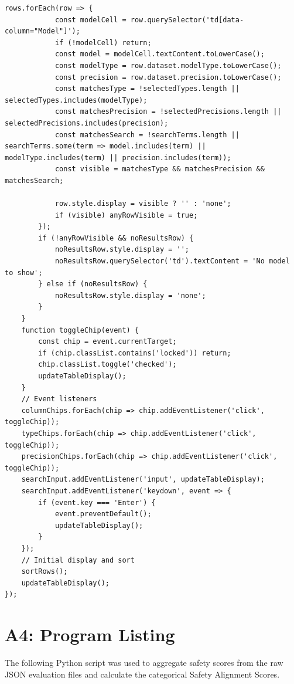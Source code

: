 \documentclass[12pt, a4paper, onecolumn]{report}
\begin{document}
\begin{lstlisting}[language=JS]
        rows.forEach(row => {
            const modelCell = row.querySelector('td[data-column="Model"]');
            if (!modelCell) return;
            const model = modelCell.textContent.toLowerCase();
            const modelType = row.dataset.modelType.toLowerCase();
            const precision = row.dataset.precision.toLowerCase();
            const matchesType = !selectedTypes.length || selectedTypes.includes(modelType);
            const matchesPrecision = !selectedPrecisions.length || selectedPrecisions.includes(precision);
            const matchesSearch = !searchTerms.length || searchTerms.some(term => model.includes(term) || modelType.includes(term) || precision.includes(term));
            const visible = matchesType && matchesPrecision && matchesSearch;

            row.style.display = visible ? '' : 'none';
            if (visible) anyRowVisible = true;
        });
        if (!anyRowVisible && noResultsRow) {
            noResultsRow.style.display = '';
            noResultsRow.querySelector('td').textContent = 'No model to show';
        } else if (noResultsRow) {
            noResultsRow.style.display = 'none';
        }
    }
    function toggleChip(event) {
        const chip = event.currentTarget;
        if (chip.classList.contains('locked')) return;
        chip.classList.toggle('checked');
        updateTableDisplay();
    }
    // Event listeners
    columnChips.forEach(chip => chip.addEventListener('click', toggleChip));
    typeChips.forEach(chip => chip.addEventListener('click', toggleChip));
    precisionChips.forEach(chip => chip.addEventListener('click', toggleChip));
    searchInput.addEventListener('input', updateTableDisplay);
    searchInput.addEventListener('keydown', event => {
        if (event.key === 'Enter') {
            event.preventDefault();
            updateTableDisplay();
        }
    });
    // Initial display and sort
    sortRows();
    updateTableDisplay();
});

\end{lstlisting}
\section*{A4: Program Listing}
The following Python script was used to aggregate safety scores from the raw JSON evaluation files and calculate the categorical Safety Alignment Scores.
\end{document}

